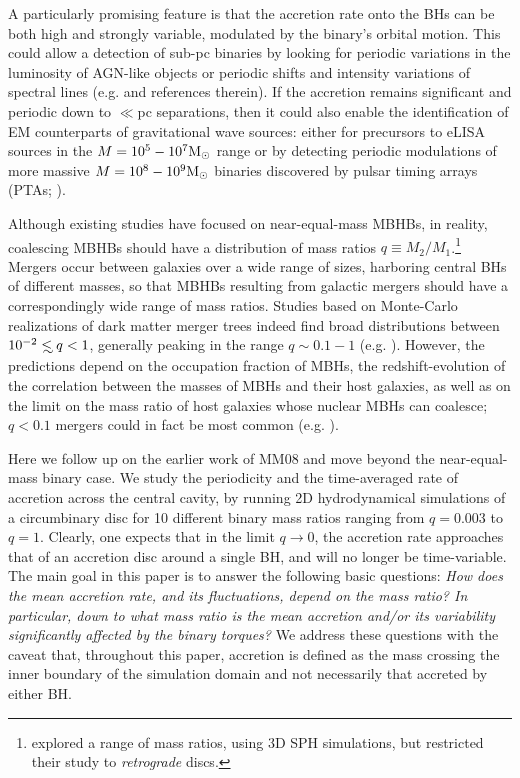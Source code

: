 A particularly promising feature is that the accretion rate onto the
BHs can be both high and strongly variable, modulated by the binary's
orbital motion. This could allow a detection of sub-pc binaries by
looking for periodic variations in the luminosity of AGN-like objects
\citep{HKM09} or periodic shifts and intensity variations of spectral
lines (e.g. \citealt{HKM09,SL2010,Eracleous:2011} and references
therein). If the accretion remains significant and periodic down to
$\ll$pc separations, then it could also enable the identification of
EM counterparts of gravitational wave sources: either for precursors
to eLISA sources in the $M=10^5-10^7{\rm M_\odot}$ range
\citep{Kocsis+2006,Kocsis+2008} or by detecting periodic modulations
of more massive $M=10^8-10^9{\rm M_\odot}$ binaries discovered by
pulsar timing arrays (PTAs; \citealt{TMH:2012,Sesana+2012}).

Although existing studies have focused on near-equal-mass MBHBs, in
reality, coalescing MBHBs should have a distribution of mass ratios
$q\equiv M_2/M_1$.\footnote{\citet{Nixon:2011:LongSim} explored a
  range of mass ratios, using 3D SPH simulations, but restricted their
  study to {\em retrograde} discs.}  Mergers occur between galaxies
over a wide range of sizes, harboring central BHs of different masses,
so that MBHBs resulting from galactic mergers should have a
correspondingly wide range of mass ratios.  Studies based on
Monte-Carlo realizations of dark matter merger trees indeed find broad
distributions between $10^{-2}\lsim q < 1$, generally peaking in the
range $q\sim 0.1-1$
(e.g. \citealt{Volonteri+2003,Sesana+2005,Sesana+2012,GergelyBiermann:2012}).
However, the predictions depend on the occupation fraction of MBHs,
the redshift-evolution of the correlation between the masses of MBHs
and their host galaxies, as well as on the limit on the mass ratio of
host galaxies whose nuclear MBHs can coalesce; $q<0.1$ mergers could
in fact be most common (e.g. \citealt{Lippai+2009}).

Here we follow up on the earlier work of MM08 and move beyond the
near-equal-mass binary case. We study the periodicity and the
time-averaged rate of accretion across the central cavity, by running
2D hydrodynamical simulations of a circumbinary disc for 10 different
binary mass ratios ranging from $q=0.003$ to $q=1$.  Clearly, one
expects that in the limit $q\rightarrow 0$, the accretion rate
approaches that of an accretion disc around a single BH, and will no
longer be time-variable.  The main goal in this paper is to answer the
following basic questions: {\em How does the mean accretion rate, and
  its fluctuations, depend on the mass ratio?  In particular, down to
  what mass ratio is the mean accretion and/or its variability
  significantly affected by the binary torques?} 
We address these questions with the caveat that, throughout this paper, accretion is defined as the mass 
crossing the inner boundary of the simulation domain and not necessarily 
that accreted by either BH.


